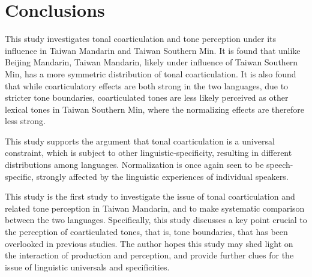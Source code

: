 
\chapter{Conclusions}

This study investigates tonal coarticulation and tone perception under its influence in Taiwan Mandarin and Taiwan Southern Min. It is found that unlike Beijing Mandarin, Taiwan Mandarin, likely under influence of Taiwan Southern Min, has a more symmetric distribution of tonal coarticulation. It is also found that while coarticulatory effects are both strong in the two languages, due to stricter tone boundaries, coarticulated tones are less likely perceived as other lexical tones in Taiwan Southern Min, where the normalizing effects are therefore less strong.

This study supports the argument that tonal coarticulation is a universal constraint, which is subject to other linguistic-specificity, resulting in different distributions among languages. Normalization is once again seen to be speech-specific, strongly affected by the linguistic experiences of individual speakers.

This study is the first study to investigate the issue of tonal coarticulation and related tone perception in Taiwan Mandarin, and to make systematic comparison between the two languages. Specifically, this study discusses a key point crucial to the perception of coarticulated tones, that is, tone boundaries, that has been overlooked in previous studies. The author hopes this study may shed light on the interaction of production and perception, and provide further clues for the issue of linguistic universals and specificities. 
